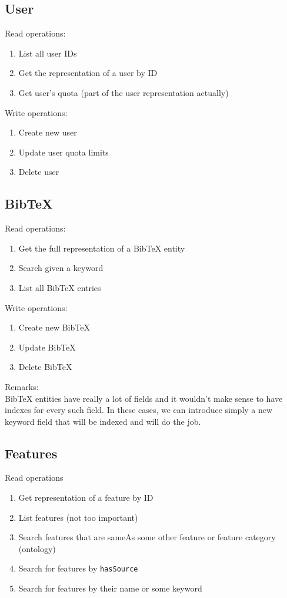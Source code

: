 \subsection{User}

\noindent Read operations:
\begin{enumerate}
 \item List all user IDs
 \item Get the representation of a user by ID
 \item Get user's quota (part of the user representation actually)
\end{enumerate}


\noindent Write operations:
\begin{enumerate}
  \item Create new user
  \item Update user quota limits
  \item Delete user
\end{enumerate}



\subsection{BibTeX}

\noindent Read operations:
\begin{enumerate}
\item Get the full representation of a BibTeX entity
\item Search given a keyword
\item List all BibTeX entries
\end{enumerate}

\noindent Write operations:
\begin{enumerate}
 \item Create new BibTeX
 \item Update BibTeX
 \item Delete BibTeX
\end{enumerate}


\noindent Remarks:\\
BibTeX entities have really a lot of fields and it wouldn’t make sense 
to have indexes for every such field. In these cases, we can introduce simply 
a new keyword field that will be indexed and will do the job.


\subsection{Features}
\noindent Read operations
\begin{enumerate}
 \item Get representation of a feature by ID
 \item List features (not too important)
 \item Search features that are sameAs some other feature or feature category (ontology)
 \item Search for features by \texttt{hasSource}
 \item Search for features by their name or some keyword
\end{enumerate}
 

